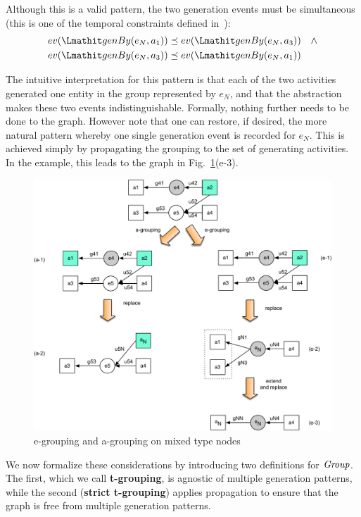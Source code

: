 Although this is a valid pattern, the two generation events must be simultaneous (this is one of the temporal constraints defined in~\citep{w3c-prov-constraints}):
\begin{align*}
ev(\wgby(e_N, a_1)) & \preorder ev(\wgby(e_N, a_3))  \quad \wedge \\
ev(\wgby(e_N, a_3)) & \preorder ev(\wgby(e_N, a_1))
\end{align*}

The intuitive interpretation for this pattern is that each of the two activities generated one entity in the group represented by $e_N$, and that the abstraction makes these two events indistinguishable. Formally, nothing further needs to be done to the graph.   However note that one can restore, if desired, the more natural pattern whereby one single generation event is recorded for $e_N$. This is achieved simply by propagating the grouping to the set of generating activities. In the example, this leads to the graph in Fig.~\ref{fig:e2-a4}(e-3).  



\begin{figure}
\centering
\includegraphics[scale=.5]{figures/e2-a4.pdf} 
\caption{e-grouping and a-grouping on mixed type nodes} \label{fig:e2-a4}
\end{figure}

We now formalize these considerations by introducing two definitions for $\mathit{Group}$. The first, which we call \textbf{t-grouping}, is agnostic of multiple generation patterns, while the second (\textbf{strict t-grouping}) applies propagation to ensure that the graph is free from multiple generation patterns.

